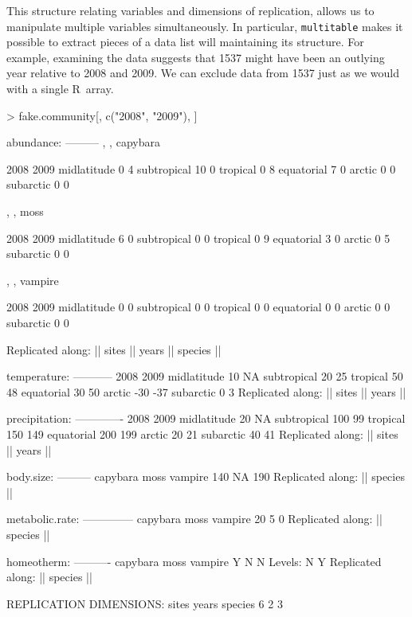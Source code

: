 \documentclass{article}
\newcommand{\R}{{\sf R}}
\newcommand{\code}[1]{\texttt{#1}}
\numberwithin{exercise}{section}
\begin{document}
This structure relating variables and dimensions of replication, allows us to manipulate multiple variables simultaneously.  In particular, \code{multitable} makes it possible to extract pieces of a data list will maintaining its structure.  For example, examining the data suggests that 1537 might have been an outlying year relative to 2008 and 2009.  We can exclude data from 1537 just as we would with a single \R\ array.
\begin{Schunk}
\begin{Sinput}
> fake.community[, c("2008", "2009"), ]
\end{Sinput}
\begin{Soutput}
abundance:
---------
, , capybara

            2008 2009
midlatitude    0    4
subtropical   10    0
tropical       0    8
equatorial     7    0
arctic         0    0
subarctic      0    0

, , moss

            2008 2009
midlatitude    6    0
subtropical    0    0
tropical       0    9
equatorial     3    0
arctic         0    5
subarctic      0    0

, , vampire

            2008 2009
midlatitude    0    0
subtropical    0    0
tropical       0    0
equatorial     0    0
arctic         0    0
subarctic      0    0

Replicated along:  || sites || years || species || 


temperature:
-----------
            2008 2009
midlatitude   10   NA
subtropical   20   25
tropical      50   48
equatorial    30   50
arctic       -30  -37
subarctic      0    3
Replicated along:  || sites || years || 


precipitation:
-------------
            2008 2009
midlatitude   20   NA
subtropical  100   99
tropical     150  149
equatorial   200  199
arctic        20   21
subarctic     40   41
Replicated along:  || sites || years || 


body.size:
---------
capybara     moss  vampire 
     140       NA      190 
Replicated along:  || species || 


metabolic.rate:
--------------
capybara     moss  vampire 
      20        5        0 
Replicated along:  || species || 


homeotherm:
----------
capybara     moss  vampire 
       Y        N        N 
Levels: N Y
Replicated along:  || species || 


REPLICATION DIMENSIONS: 
  sites   years species 
      6       2       3 
\end{Soutput}
\end{Schunk}
\end{document}
